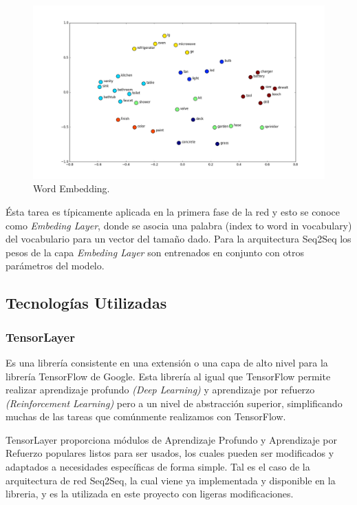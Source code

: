 \documentclass[12pt, letterpaper]{article}
\begin{document}
        \begin{figure}[H]
            \centering
            \includegraphics[width=\linewidth]{img/we1.png}
            \caption{Word Embedding.}
        \end{figure}
    
        Ésta tarea es típicamente aplicada en la primera fase de la red y esto se conoce como \emph{Embeding Layer}, donde se asocia una palabra (index to word in vocabulary) del vocabulario para un vector del tamaño dado. Para la arquitectura Seq2Seq los pesos de la capa \emph{Embeding Layer} son entrenados en conjunto con otros parámetros del modelo\cite{Ramamoorthy}.

    \subsection{Tecnologías Utilizadas}
        \subsubsection{TensorLayer}
        Es una librería consistente en una extensión o una capa de alto nivel para la librería TensorFlow de Google. Esta librería al igual que TensorFlow permite realizar aprendizaje profundo \emph{(Deep Learning)} y aprendizaje por refuerzo \emph{(Reinforcement Learning)} pero a un nivel de abstracción superior, simplificando muchas de las tareas que comúnmente realizamos con TensorFlow.
        
        TensorLayer proporciona módulos de Aprendizaje Profundo y Aprendizaje por Refuerzo populares listos para ser usados, los cuales pueden ser modificados y adaptados a necesidades específicas de forma simple. Tal es el caso de la arquitectura de red Seq2Seq, la cual viene ya implementada y disponible en la libreria, y es la utilizada en este proyecto con ligeras modificaciones.
        
\end{document}
